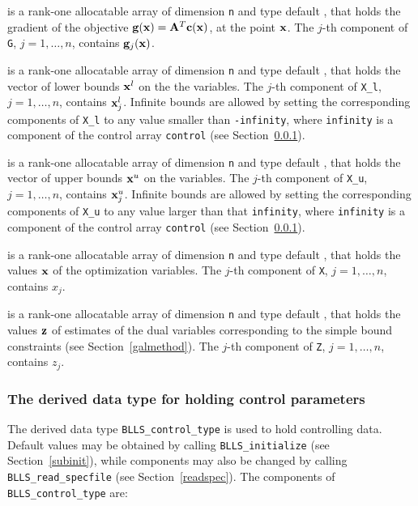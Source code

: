 \documentclass{galahad}
\newcommand{\packagename}{BLLS}
\begin{document}
\begin{description}
 is a rank-one allocatable array of dimension {\tt n} and type
default \realdp, that holds the gradient of the objective
 ${\mathbf{g}}({\mathbf{x}}) = {\mathbf{A}}^T {\mathbf{c}}({\mathbf{x}})$, at the point ${\mathbf{x}}$. The $j$-th component of
{\tt G}, $j = 1, \ldots, n$, contains ${\mathbf{g}}_{j}({\mathbf{x}})$.

 is a rank-one allocatable array of dimension {\tt n} and type
default \realdp, that holds
the vector of lower bounds ${\mathbf{x}}^{l}$ on the the variables.
The $j$-th component of {\tt X\_l}, $j = 1, \ldots , n$,
contains ${\mathbf{x}}_{j}^{l}$.
Infinite bounds are allowed by setting the corresponding
components of {\tt X\_l} to any value smaller than {\tt -infinity},
where {\tt infinity} is a component of the control array {\tt control}
(see Section~\ref{typecontrol}).

 is a rank-one allocatable array of dimension {\tt n} and type
default \realdp, that holds
the vector of upper bounds ${\mathbf{x}}^{u}$ on the variables.
The $j$-th component of {\tt X\_u}, $j = 1, \ldots , n$,
contains ${\mathbf{x}}_{j}^{u}$.
Infinite bounds are allowed by setting the corresponding
components of {\tt X\_u} to any value larger than that {\tt infinity},
where {\tt infinity} is a component of the control array {\tt control}
(see Section~\ref{typecontrol}).

 is a rank-one allocatable array of dimension {\tt n} and type
default \realdp,
that holds the values ${\mathbf{x}}$ of the optimization variables.
The $j$-th component of {\tt X}, $j = 1,  \ldots , n$, contains $x_{j}$.

 is a rank-one allocatable array of dimension {\tt n} and type default
\realdp, that holds
the values ${\mathbf{z}}$ of estimates  of the dual variables
corresponding to the simple bound constraints (see Section~\ref{galmethod}).
The $j$-th component of {\tt Z}, $j = 1,  \ldots ,  n$, contains $z_{j}$.

\end{description}


\subsubsection{The derived data type for holding control
 parameters}\label{typecontrol}
The derived data type
{\tt \packagename\_control\_type}
is used to hold controlling data. Default values may be obtained by calling
{\tt \packagename\_initialize}
(see Section~\ref{subinit}),
while components may also be changed by calling
{\tt \packagename\_read\-\_specfile}
(see Section~\ref{readspec}).
The components of
{\tt \packagename\_control\_type}
are:
\end{document}
